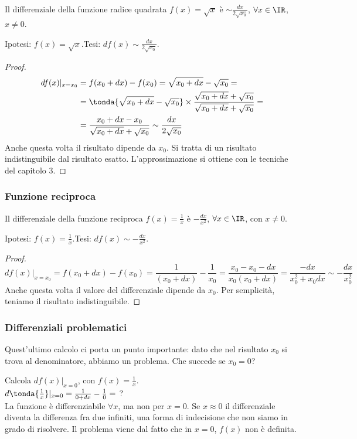 \begin{teorema}
 Il differenziale della funzione radice quadrata $f(x)=\sqrt{x}$ è
 $\sim\frac{dx}{2\sqrt{x_0}}$, $\forall x\in \IR$, $x\neq 0$.
\end{teorema}

\noindent Ipotesi: \(f(x)=\sqrt{x}\).\tab Tesi: 
\(df(x)\sim\frac{dx}{2\sqrt{x_0}}\).

\begin{proof}
\begin{align*}
 df(x)|_{x=x_0} &= f(x_0+dx)-f(x_0)=\sqrt{x_0+dx}-\sqrt{x_0}=\\
 &=\tonda{\sqrt{x_0+dx}-\sqrt{x_0}}\times\frac{\sqrt{x_0+dx}+
 \sqrt{x_0}}{\sqrt{x_0+dx}+\sqrt{x_0}}=\\
 &=\frac{x_0+dx-x_0}{\sqrt{x_0+dx}+\sqrt{x_0}}\sim\frac{dx}{2\sqrt{x_0}}
\end{align*}
Anche questa volta il risultato dipende da $x_0$. Si tratta di 
un risultato indistinguibile dal risultato esatto. L'approssimazione si 
ottiene
con le tecniche del capitolo 3.
\end{proof}

\subsubsection{Funzione reciproca}
\label{subsubsec:diff01_diffrecip}
\begin{teorema}
 Il differenziale della funzione reciproca $f(x)=\frac{1}{x}$ è 
$-\frac{dx}{x^2}$, 
 $\forall x\in \IR$, con $x\neq 0$.
\end{teorema}

\noindent Ipotesi: $f(x)=\frac{1}{x}$.\tab Tesi: $df(x)\sim-\frac{dx}{x^2}$.

\begin{proof}
\[
 df(x)|_{x=x_0}= f(x_0+dx)-f(x_0)=\frac{1}{(x_0+dx)}-\frac{1}{x_0}=
 \frac{x_0-x_0-dx}{x_0(x_0+dx)}=\frac{-dx}{x_0^2+x_0dx}\sim-\frac{dx}{x_0^2}
\]
Anche questa volta il valore del differenziale dipende da $x_0$. 
Per semplicità, teniamo il risultato indistinguibile.
\end{proof}

\subsubsection{Differenziali problematici}
\label{subsubsec:diff01_diffproblemi}

Quest'ultimo calcolo ci porta un punto importante: dato che nel risultato
$x_0$ si trova al denominatore, abbiamo un problema. Che succede se $x_0=0$?
\begin{esempio}
 Calcola $df(x)|_{x=0}$, con $f(x)=\frac{1}{x}$.\\
 $d\tonda{\frac{1}{x}}|_{x=0}=\frac{1}{0+dx}-\frac{1}{0}=$ ?\\
 La funzione è differenziabile $\forall x$, ma non per $x=0$. Se $x\approx 0$
 il differenziale diventa la differenza fra due infiniti, una forma di 
 indecisione che non siamo in grado di risolvere. Il problema viene dal fatto 
 che in $x=0$, $f(x)$ non è definita.
\end{esempio}

